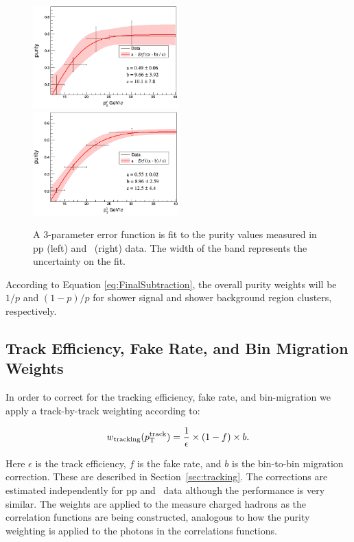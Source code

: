 \begin{figure}
	\label{fig:Purity_Error_Function}
	\includegraphics[width=0.5\textwidth]{Data_Analysis/Error_Function_Fits/pp_Mean_Center}
	\includegraphics[width=0.5\textwidth]{Data_Analysis/Error_Function_Fits/pPb_Mean_Centers}
  \caption{A 3-parameter error function is fit to the purity values measured in pp (left) and \pPb~(right) data. The width of the band represents the uncertainty on the fit.}
\end{figure}


According to Equation \ref{eq:FinalSubtraction}, the overall purity weights will be $1/p$ and $(1-p)/p$ for shower signal and shower background region clusters, respectively. 

\subsection{Track Efficiency, Fake Rate, and Bin Migration Weights}
In order to correct for the tracking efficiency, fake rate, and bin-migration we apply a track-by-track weighting according to:

\begin{equation}
w_{\mathrm{tracking}}(p_{\mathrm{T}}^{\mathrm{track}}) = \frac{1}{\epsilon}\times(1- f)\times b.
\end{equation}

Here $\epsilon$ is the track efficiency, $f$ is the fake rate, and $b$ is the bin-to-bin migration correction. These are described in Section~\ref{sec:tracking}. The corrections are estimated independently for pp and \pPb~data although the performance is very similar. The weights are applied to the measure charged hadrons as the correlation functions are being constructed, analogous to how the purity weighting is applied to the photons in the correlations functions.

